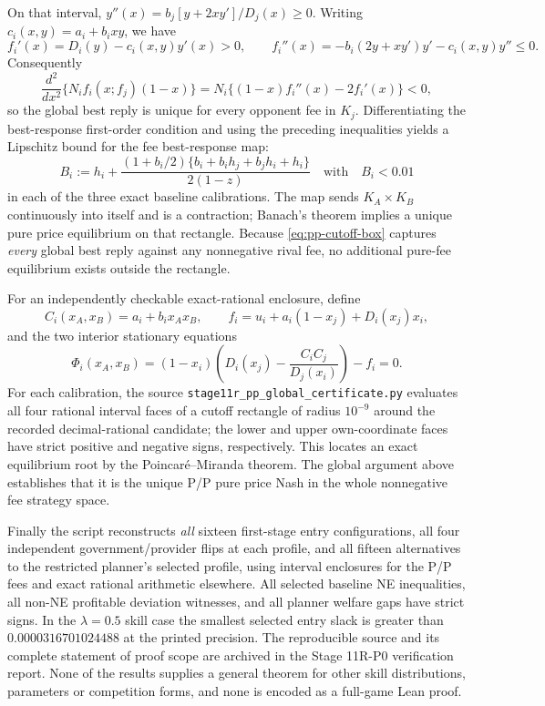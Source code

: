 On that interval, $y''(x)=b_j[y+2xy']/D_j(x)\geq0$. Writing $c_i(x,y)=a_i+b_i xy$, we have
\[
 f_i'(x)=D_i(y)-c_i(x,y)y'(x)>0,\qquad
 f_i''(x)=-b_i(2y+xy')y'-c_i(x,y)y''\leq0.
\]
Consequently
\[
 \frac{d^2}{dx^2}\{N_if_i(x;f_j)(1-x)\}
 =N_i\{(1-x)f_i''(x)-2f_i'(x)\}<0,
\]
so the global best reply is unique for every opponent fee in $K_j$. Differentiating the best-response first-order condition and using the preceding inequalities yields a Lipschitz bound for the fee best-response map:
\begin{equation}
 B_i:=h_i+\frac{(1+b_i/2)\{b_i+b_ih_j+b_jh_i+h_i\}}{2(1-z)}
 \quad\text{with}\quad B_i<0.01
 \label{eq:pp-br-contraction}
\end{equation}
in each of the three exact baseline calibrations. The map sends $K_A\times K_B$ continuously into itself and is a contraction; Banach's theorem implies a unique pure price equilibrium on that rectangle. Because \eqref{eq:pp-cutoff-box} captures \emph{every} global best reply against any nonnegative rival fee, no additional pure-fee equilibrium exists outside the rectangle.

For an independently checkable exact-rational enclosure, define
\[
 C_i(x_A,x_B)=a_i+b_ix_Ax_B,\qquad
 f_i=u_i+a_i(1-x_j)+D_i(x_j)x_i,
\]
and the two interior stationary equations
\[
 \Phi_i(x_A,x_B)
 =(1-x_i)\left(D_i(x_j)-\frac{C_iC_j}{D_j(x_i)}\right)-f_i=0.
\]
For each calibration, the source \texttt{stage11r\_pp\_global\_certificate.py} evaluates all four rational interval faces of a cutoff rectangle of radius $10^{-9}$ around the recorded decimal-rational candidate; the lower and upper own-coordinate faces have strict positive and negative signs, respectively. This locates an exact equilibrium root by the Poincar\'e--Miranda theorem. The global argument above establishes that it is the unique P/P pure price Nash in the whole nonnegative fee strategy space.

Finally the script reconstructs \emph{all} sixteen first-stage entry configurations, all four independent government/provider flips at each profile, and all fifteen alternatives to the restricted planner's selected profile, using interval enclosures for the P/P fees and exact rational arithmetic elsewhere. All selected baseline NE inequalities, all non-NE profitable deviation witnesses, and all planner welfare gaps have strict signs. In the $\lambda=0.5$ skill case the smallest selected entry slack is greater than $0.0000316701024488$ at the printed precision. The reproducible source and its complete statement of proof scope are archived in the Stage 11R-P0 verification report. None of the results supplies a general theorem for other skill distributions, parameters or competition forms, and none is encoded as a full-game Lean proof.

